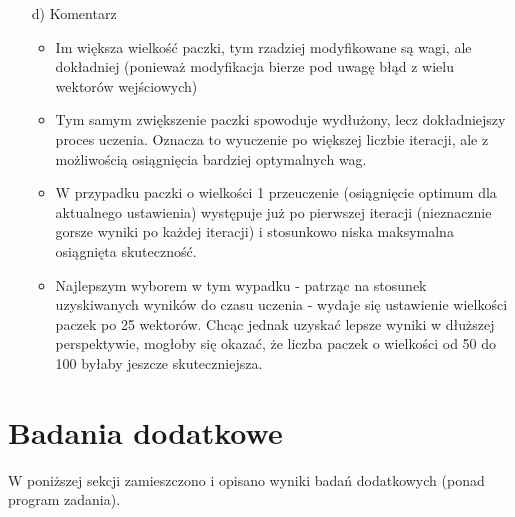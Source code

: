 \documentclass[17pt]{article}
\begin{document}
\begin{enumerate}
\item[d)] Komentarz
\begin{itemize}
\item Im większa wielkość paczki, tym rzadziej modyfikowane są wagi, ale dokładniej (ponieważ modyfikacja bierze pod uwagę błąd z wielu wektorów wejściowych)
\item Tym samym zwiększenie paczki spowoduje wydłużony, lecz dokładniejszy proces uczenia. Oznacza to wyuczenie po większej liczbie iteracji, ale z możliwością osiągnięcia bardziej optymalnych wag.
\item W przypadku paczki o wielkości 1 przeuczenie (osiągnięcie optimum dla aktualnego ustawienia) występuje już po pierwszej iteracji (nieznacznie gorsze wyniki po każdej iteracji) i stosunkowo niska maksymalna osiągnięta skuteczność.
\item Najlepszym wyborem w tym wypadku - patrząc na stosunek uzyskiwanych wyników do czasu uczenia - wydaje się ustawienie wielkości paczek po 25 wektorów. Chcąc jednak uzyskać lepsze wyniki w dłuższej perspektywie, mogłoby się okazać, że liczba paczek o wielkości od 50 do 100 byłaby jeszcze skuteczniejsza.


\end{itemize}

\end{enumerate}
\newpage

\section{Badania dodatkowe}
W poniższej sekcji zamieszczono i opisano wyniki badań dodatkowych (ponad program zadania).
\end{document}
